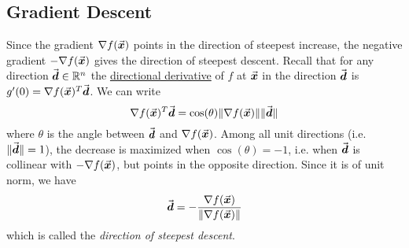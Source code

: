 \subsection{Gradient Descent}
\label{subsec:gradient_descent}
\begin{center}
\end{center}

Since the gradient \(\nabla f(\vec{\boldsymbol{x}})\) points in the direction of steepest increase, the negative gradient \(-\nabla f(\vec{\boldsymbol{x}})\) gives the direction of steepest descent. 
Recall that for any direction \(\vec{\boldsymbol{d}}\in\mathbb{R}^{n}\) the \hyperlink{directional_derivative}{directional derivative} of \(f\) at \(\vec{\boldsymbol{x}}\) in the direction \(\vec{\boldsymbol{d}}\) is
\(
g'(0)=\nabla f(\vec{\boldsymbol{x}})^{T}\vec{\boldsymbol{d}}
\). We can write 
\[
\nabla f(\vec{\boldsymbol{x}})^{T}\vec{\boldsymbol{d}} = \cos(\theta)\|\nabla f(\vec{\boldsymbol{x}})\| \|\vec{\boldsymbol{d}}\| 
\]
where \(\theta\) is the angle between \(\vec{\boldsymbol{d}}\) and \(\nabla f(\vec{\boldsymbol{x}})\).
Among all unit directions (i.e. \(\|\vec{\boldsymbol{d}}\|=1\)), the decrease is maximized when \(\cos(\theta)=-1\), i.e. when \(\vec{\boldsymbol{d}}\) is collinear with \(-\nabla f(\vec{\boldsymbol{x}})\), but points in the opposite direction. 
Since it is of unit norm, we have
\[
\vec{\boldsymbol{d}}=-\frac{\nabla f(\vec{\boldsymbol{x}})}{\|\nabla f(\vec{\boldsymbol{x}})\|}
\] 
which is called the \emph{direction of steepest descent}.

